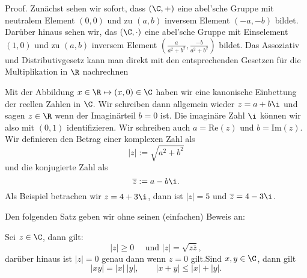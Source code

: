\documentclass[letterpaper,10pt,english]{jupyterBook}
\begin{document}
\begin{emphBox}{}{}
Proof.  Zunächst sehen wir sofort, dass \((\C,+)\) eine abel’sche Gruppe mit neutralem Element \((0,0)\) und zu \((a,b)\) inversem Element \((-a,-b)\) bildet. Darüber hinaus sehen wir, das \((\C,\cdot)\) eine abel’sche Gruppe mit Einselement \((1,0)\) und zu \((a,b)\) inversem Element \((\frac{a}{a^2+b^2},  \frac{-b}{a^2+b^2}) \) bildet. Das Assoziativ  und Distributivgesetz kann man direkt mit den entsprechenden Gesetzen für die Multiplikation in \(\R\) nachrechnen
\end{emphBox}

Mit der Abbildung \(x \in \R \mapsto (x,0) \in \C\) haben wir eine kanonische Einbettung der reellen Zahlen in \(\C\). Wir schreiben dann allgemein wieder \(z=a+b\i\) und sagen \(z \in\R\) wenn der Imaginärteil \(b=0\) ist.  Die imaginäre Zahl \(\i\) können wir also mit \((0,1)\) identifizieren.  Wir schreiben auch \(a=\)Re\((z)\) und \(b=\)Im\((z)\). Wir definieren den Betrag einer komplexen Zahl als
\begin{equation*}
 |z| := \sqrt{a^2+b^2}
\end{equation*}
und die konjugierte Zahl als
\begin{equation*}
 \overline{z} := a - b \i.
\end{equation*}
Als Beispiel betrachen wir \(z= 4+3\i\), dann ist \(|z|=5\) und \(\overline{z}=4-3\i\).

Den folgenden Satz geben wir ohne seinen (einfachen) Beweis an:
\label{grundlagen/zahlensysteme:theorem-30}
\begin{theorem}{}{}



Sei \(z \in \C \), dann gilt:
\begin{equation*}
  |z| \geq 0\quad \text{ und } |z|=\sqrt{z \overline{z}},
\end{equation*}
darüber hinaus ist \(|z|=0\) genau dann wenn \(z=0\) gilt.Sind \(x,y \in \C\), dann gilt
\begin{equation*}
 |xy|=|x|~|y|,\qquad |x+y| \leq |x|+|y| .
\end{equation*}\end{theorem}
\end{document}
